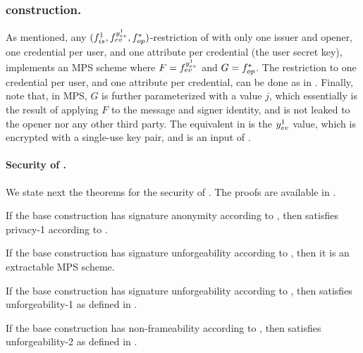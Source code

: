 \subsubsection{\CUASMPS construction.} %
As mentioned, any $(f_{is}^1,f_{ev}^{y_{ev}^1},f_{op}^\ast)$-restriction of
\CUASGen with only one issuer and opener, one credential per user, and one
attribute per credential (the user secret key), implements an MPS scheme where
$F=f_{ev}^{y_{ev}^1}$ and $G=f_{op}^\ast$. The restriction to one credential per
user, and one attribute per credential, can be done as in
. Finally, note that, in MPS, $G$ is further
parameterized with a value $j$, which essentially is the result of applying $F$
to the message and signer identity, and is not leaked to the opener nor any
other third party. The equivalent in \UAS is the $y_{ev}^1$ value, which is
encrypted with a single-use key pair, and is an input of \yinsp.

\paragraph{Security of \CUASMPS.} %
We state next the theorems for the security of \CUASMPS. The proofs are
available in .

\begin{theorem}
  If the base \CUASGen construction has signature anonymity according to
  , then \CUASMPS satisfies privacy-1
  according to \needcite.
\end{theorem}

\begin{theorem}
  If the base \CUASGen construction has signature unforgeability according to
  , then it is an extractable MPS scheme.
\end{theorem}

\begin{theorem}
  If the base \CUASGen construction has signature unforgeability according to
  , then \CUASMPS satisfies unforgeability-1 as
  defined in \needcite.
\end{theorem}

\begin{theorem}
  If the base \CUASGen construction has non-frameability according to
  , then \CUASMPS satisfies unforgeability-2 as
  defined in \needcite.
\end{theorem}

